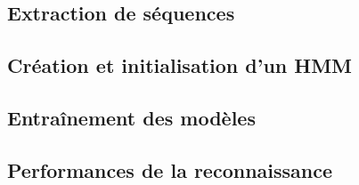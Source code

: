 \subsection{Extraction de séquences}
\subsection{Création et initialisation d'un HMM}
\subsection{Entraînement des modèles}
\subsection{Performances de la reconnaissance}
